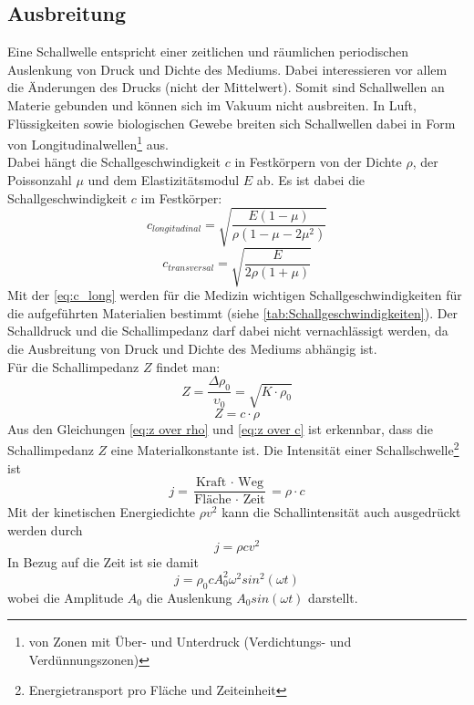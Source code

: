 \subsection{Ausbreitung}\label{sec:ausbreitung}
Eine Schallwelle entspricht einer zeitlichen und räumlichen periodischen Auslenkung von Druck und Dichte des Mediums. Dabei interessieren vor allem die Änderungen des Drucks (nicht der Mittelwert). Somit sind Schallwellen an Materie gebunden und können sich im Vakuum nicht ausbreiten. In Luft, Flüssigkeiten sowie biologischen Gewebe breiten sich Schallwellen dabei in Form von Longitudinalwellen\footnote{von Zonen mit Über- und Unterdruck (Verdichtungs- und Verdünnungszonen)} aus. \\
Dabei hängt die Schallgeschwindigkeit $c$ in Festkörpern von der Dichte \(\rho\), der Poissonzahl \(\mu\) und dem Elastizitätsmodul \(E\) ab. Es ist dabei die Schallgeschwindigkeit $c$ im Festkörper:
\begin{equation}
c_{longitudinal}=\sqrt{\dfrac{E(1-\mu)}{\rho(1-\mu-2\mu^2)}}\label{eq:c_long}
\end{equation}
\begin{equation}
c_{transversal}=\sqrt{\dfrac{E}{2\rho(1+\mu)}}\label{eq:c_trans}
\end{equation}
Mit der \autoref{eq:c_long} werden für die Medizin wichtigen Schallgeschwindigkeiten für die aufgeführten Materialien bestimmt (siehe \autoref{tab:Schallgeschwindigkeiten}).
Der Schalldruck und die Schallimpedanz darf dabei nicht vernachlässigt werden, da die Ausbreitung von Druck und Dichte des Mediums abhängig ist.\\
Für die Schallimpedanz $Z$ findet man:
\begin{equation}
Z=\dfrac{\Delta\rho_0}{\upsilon_0}=\sqrt{K\cdot\rho_0}
\label{eq:z over rho}
\end{equation}
\begin{equation}
Z=c\cdot\rho
\label{eq:z over c}
\end{equation}
Aus den Gleichungen \ref{eq:z over rho} und \ref{eq:z over c} ist erkennbar, dass die Schallimpedanz $Z$ eine Materialkonstante ist.\newline
Die Intensität einer Schallschwelle\footnote{Energietransport pro Fläche und Zeiteinheit} ist
\begin{equation}
j=\dfrac{\text{Kraft $\cdot$ Weg}}{\text{Fläche $\cdot$ Zeit}}=\rho\cdot c
\label{eq:j}
\end{equation}
Mit der kinetischen Energiedichte \(\rho v^2\) kann die Schallintensität auch ausgedrückt werden durch
\begin{equation}
j=\rho c v^2
\end{equation}
In Bezug auf die Zeit ist sie damit
\begin{equation}
j=\rho_0 c A_0^2\omega^2 sin^2(\omega t)
\end{equation}
wobei die Amplitude \(A_0\) die Auslenkung \(A_0 sin(\omega t)\) darstellt.
%
\cite{suter2006}\cite{suter2009}\cite{suter2010}
%
